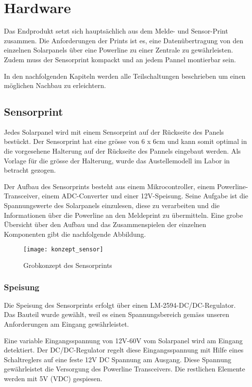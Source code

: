 \section{Hardware}
Das Endprodukt setzt sich hauptsächlich aus dem Melde- und Sensor-Print zusammen. Die Anforderungen der Prints ist es, eine Datenübertragung von den einzelnen Solarpanels über eine Powerline zu einer Zentrale zu gewährleisten. Zudem muss der Sensorprint kompackt und an jedem Pannel montierbar sein.

In den nachfolgenden Kapiteln werden alle Teilschaltungen beschrieben um einen möglichen Nachbau zu erleichtern.

\subsection{Sensorprint}


Jedes Solarpanel wird mit einem Sensorprint auf der Rückseite des Panels bestückt. Der Sensorprint hat eine grösse von 6 x 6cm und kann somit optimal in die vorgesehene Halterung auf der Rückseite des Pannels eingebaut werden. Als Vorlage für die grösse der Halterung, wurde das Austellemodell im Labor in betracht gezogen.

Der Aufbau des Sensorprints besteht aus einem Mikrocontroller, einem Powerline-Transceiver, einem ADC-Converter und einer 12V-Speisung. Seine Aufgabe ist die Spannungswerte des Solarpanels einzulesen, diese zu verarbeiten und die Informationen über die Powerline an den Meldeprint zu übermitteln. Eine grobe Übersicht über den Aufbau und das Zusammenspielen der einzelnen Komponenten gibt die nachfolgende Abbildung.

\begin{figure}[h]
\centering
\texttt{[image: konzept\_sensor]}
\caption{Grobkonzept des Sensorprints}
\end{figure}

\subsubsection{Speisung}
Die Speisung des Sensorprints erfolgt über einen LM-2594-DC/DC-Regulator. Das Bauteil wurde gewählt, weil es einen Spannungsbereich gemäss unseren Anforderungen am Eingang gewährleistet.

Eine variable Eingangsspannung von 12V-60V vom Solarpanel wird am Eingang detektiert. Der DC/DC-Regulator regelt diese Eingangsspannung mit Hilfe eines Schaltreglers auf eine feste 12V DC Spannung am Ausgang. Diese Spannung gewährleistet die Versorgung des Powerline Transceivers. Die restlichen Elemente werden mit 5V (VDC) gespiesen.

